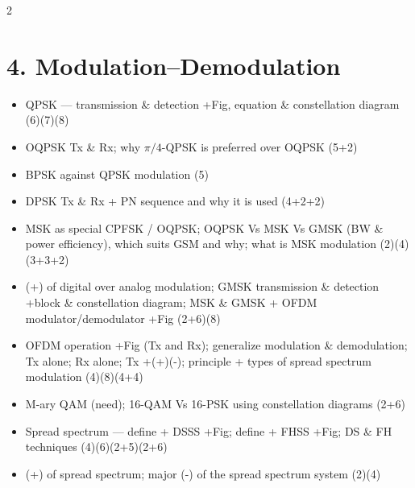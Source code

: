 \documentclass[10pt]{article}
\begin{document}
\begin{multicols}{2}
\section*{4. Modulation--Demodulation}
\begin{itemize}
  \item QPSK --- transmission \& detection +Fig, equation \& constellation diagram \hfill (6)(7)(8)
  \item OQPSK Tx \& Rx; why $\pi/4$-QPSK is preferred over OQPSK \hfill (5+2)
  \item BPSK against QPSK modulation \hfill (5)
  \item DPSK Tx \& Rx + PN sequence and why it is used \hfill (4+2+2)
  \item MSK as special CPFSK / OQPSK; OQPSK Vs MSK Vs GMSK (BW \& power efficiency), which suits GSM and why; what is MSK modulation \hfill (2)(4)(3+3+2)
  \item (+) of digital over analog modulation; GMSK transmission \& detection +block \& constellation diagram; MSK \& GMSK + OFDM modulator/demodulator +Fig \hfill (2+6)(8)
  \item OFDM operation +Fig (Tx and Rx); generalize modulation \& demodulation; Tx alone; Rx alone; Tx +(+)(-); principle + types of spread spectrum modulation \hfill (4)(8)(4+4)
  \item M-ary QAM (need); 16-QAM Vs 16-PSK using constellation diagrams \hfill (2+6)
  \item Spread spectrum --- define + DSSS +Fig; define + FHSS +Fig; DS \& FH techniques \hfill (4)(6)(2+5)(2+6)
  \item (+) of spread spectrum; major (-) of the spread spectrum system \hfill (2)(4)
\end{itemize}


\end{multicols}
\end{document}
